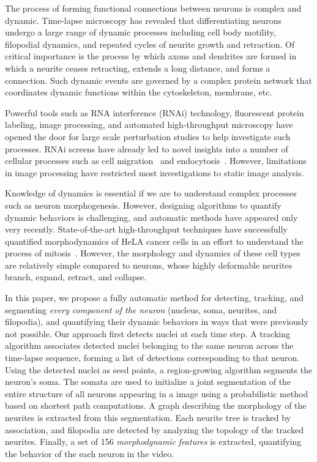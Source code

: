 

The  process  of forming  functional  connections  between neurons  is
complex  and   dynamic.   Time-lapse  microscopy   has  revealed  that
differentiating  neurons undergo  a large  range of  dynamic processes
including cell body motility, filopodial dynamics, and repeated cycles
of  neurite growth  and  retraction.  Of  critical  importance is  the
process  by which  axons and  dendrites are  formed in  which a neurite
ceases retracting, extends a   long  distance, and  forms
a connection. Such  dynamic events are  governed by a  complex protein
network that  coordinates   dynamic functions 
within the cytoskeleton, membrane, etc.

Powerful tools such as 
RNA interference  (RNAi)
technology,  fluorescent  protein   labeling,  image  processing,  and
automated high-throughput  microscopy have  opened the door  for large
scale  perturbation studies to help investigate such processes. RNAi  screens have  already led  to novel
insights   into  a  number   of  cellular   processes  such   as  cell
migration~\cite{Bakal07}  and endocytosis~\cite{Collinet10}.  However,
limitations  in  image  processing  have  restricted  most
investigations to static image analysis.

Knowledge  of dynamics is  essential if we are  to understand
complex  processes such  as neuron  morphogenesis.  However, designing
algorithms to quantify dynamic  behaviors is challenging, and
automatic methods  have appeared only  very recently. State-of-the-art
high-throughput techniques have successfully quantified morphodynamics
of  HeLA cancer  cells  in an  effort  to understand  the process  of
mitosis~\cite{Held10,Neumann10,Zhu05}.   However,  the morphology  and
dynamics of  these cell types  are relatively simple compared to neurons,
whose highly deformable  neurites  branch, expand,
retract, and collapse. 

In this paper, we propose a  fully automatic method for detecting, tracking, and
segmenting {\em  every component  of the neuron}  (nucleus, soma,  neurites, and
filopodia), and quantifying their dynamic behaviors in ways that were previously
not possible. Our  approach first detects nuclei at each  time step.  A tracking
algorithm associates  detected nuclei  belonging to the  same neuron  across the
time-lapse sequence, forming a list  of detections corresponding to that neuron.
Using the  detected nuclei as  seed points, a region-growing  algorithm segments
the neuron's  soma.  The somata are  used to initialize a  joint segmentation of
the entire structure  of all neurons appearing in a  image using a probabilistic
method based on  shortest path computations.  A graph  describing the morphology
of  the neurites  is extracted  from this  segmentation.  Each  neurite  tree is
tracked by association, and filopodia  are detected by analyzing the topology of
the tracked  neurites.  Finally,  a set of  156 {\em morphodynamic  features} is
extracted, quantifying the behavior of the each neuron in the video.


